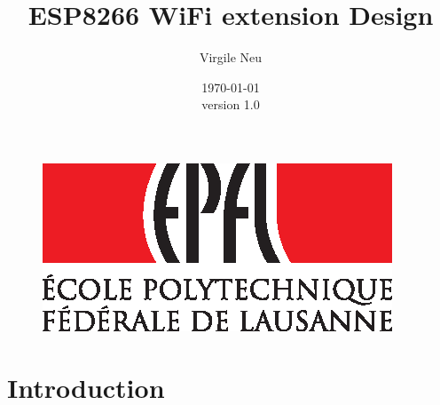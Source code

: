 \documentclass[11pt]{article}
\title{\textbf{ESP8266 WiFi extension Design}}
\author{Virgile Neu}
\date{\today \\ version 1.0}
\begin{document}
\maketitle
    \begin{figure}
        \center
        \includegraphics[scale=0.9]{EPFL-Logo-CMJN.eps}
    \end{figure}
    \newpage
    
\tableofcontents

\newpage

\setcounter{page}{1}
\rfoot{\thepage}

\section{Introduction}
\end{document}
